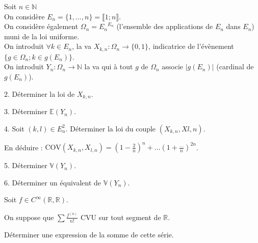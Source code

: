 \vspace{5pt}
\noindent Soit $n \in \mathbb{N}$ \\
\noindent On considère $E_n = \{1, ..., n\} = \llbracket 1;n \rrbracket$. \\
\noindent On considère également $\Omega_n = {E_n}^{E_n}$
(l'ensemble des applications de $E_n$ dans $E_n$) muni de la loi uniforme. \\
\noindent On introduit $\forall k \in E_n$, la va $X_{k,n} : \Omega_n \rightarrow \{0,1\}$,
indicatrice de l'évènement $\{g \in \Omega_n; k \in g(E_n)\}$. \\
\noindent On introduit $Y_n : \Omega_n \rightarrow \mathbb{N}$ la va qui à tout $g$ de $\Omega_n$
associe $|g(E_n)|$ (cardinal de $g(E_n)$).

\vspace{5pt}
2. Déterminer la loi de $X_{k,n}$.

\vspace{5pt}
3. Déterminer $\mathbb{E}(Y_n)$.

\vspace{5pt}
4. Soit $(k,l) \in E_n^2$. Déterminer la loi du couple $(X_{k,n}, X{l,n})$.

En déduire :
$\textrm{COV}(X_{k,n}, X_{l,n}) = \left( 1 - \frac {2} {n}\right) ^n + ... \left(1 + \frac {...} {n}\right)^{2n}$.

\vspace{5pt}
5. Déterminer $\mathbb{V}(Y_n)$.

\vspace{5pt}
6. Déterminer un équivalent de $\mathbb{V}(Y_n)$.



\subetoiles



\noindent Soit $f \in C^{\infty}(\mathbb{R}, \mathbb{R})$.

\noindent On suppose que $\sum \frac {f^{(n)}} {n!}$ CVU sur tout segment de $\mathbb{R}$.

\noindent Déterminer une expression de la somme de cette série.



\subetoiles
\columnbreak